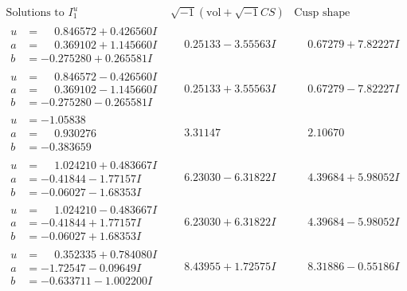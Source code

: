 \documentclass[1p]{elsarticle_modified}
\theoremstyle{definition}
\newcommand{\I}{\sqrt{-1}}
\begin{document}
$$\begin{array}{c|c|c}  
\text{Solutions to }I^u_{1}& \I (\text{vol} + \sqrt{-1}CS) & \text{Cusp shape}\\
 \hline 
\begin{aligned}
u &= \phantom{-}0.846572 + 0.426560 I \\
a &= \phantom{-}0.369102 + 1.145660 I \\
b &= -0.275280 + 0.265581 I\end{aligned}
 & \phantom{-}0.25133 - 3.55563 I & \phantom{-}0.67279 + 7.82227 I \\ \hline\begin{aligned}
u &= \phantom{-}0.846572 - 0.426560 I \\
a &= \phantom{-}0.369102 - 1.145660 I \\
b &= -0.275280 - 0.265581 I\end{aligned}
 & \phantom{-}0.25133 + 3.55563 I & \phantom{-}0.67279 - 7.82227 I \\ \hline\begin{aligned}
u &= -1.05838\phantom{ +0.000000I} \\
a &= \phantom{-}0.930276\phantom{ +0.000000I} \\
b &= -0.383659\phantom{ +0.000000I}\end{aligned}
 & \phantom{-}3.31147\phantom{ +0.000000I} & \phantom{-}2.10670\phantom{ +0.000000I} \\ \hline\begin{aligned}
u &= \phantom{-}1.024210 + 0.483667 I \\
a &= -0.41844 - 1.77157 I \\
b &= -0.06027 - 1.68353 I\end{aligned}
 & \phantom{-}6.23030 - 6.31822 I & \phantom{-}4.39684 + 5.98052 I \\ \hline\begin{aligned}
u &= \phantom{-}1.024210 - 0.483667 I \\
a &= -0.41844 + 1.77157 I \\
b &= -0.06027 + 1.68353 I\end{aligned}
 & \phantom{-}6.23030 + 6.31822 I & \phantom{-}4.39684 - 5.98052 I \\ \hline\begin{aligned}
u &= \phantom{-}0.352335 + 0.784080 I \\
a &= -1.72547 - 0.09649 I \\
b &= -0.633711 - 1.002200 I\end{aligned}
 & \phantom{-}8.43955 + 1.72575 I & \phantom{-}8.31886 - 0.55186 I \\ \hline\begin{aligned}

\end{aligned}
\end{array}$$
\end{document}

